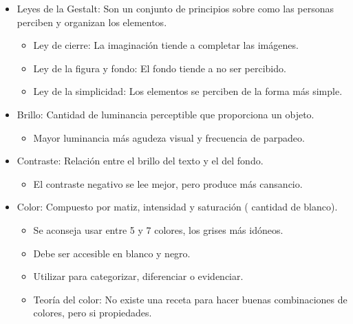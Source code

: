 \documentclass[12pt, twoside, openright]{report} %
\begin{document}
      \begin{itemize}
      
      \item
        Leyes de la Gestalt: Son un conjunto de principios sobre como
        las personas perciben y organizan los elementos.

        \begin{itemize}
        
        \item
          Ley de cierre: La imaginación tiende a completar las imágenes.
        \item
          Ley de la figura y fondo: El fondo tiende a no ser percibido.
        \item
          Ley de la simplicidad: Los elementos se perciben de la forma
          más simple.
        \end{itemize}
      \item
        Brillo: Cantidad de luminancia perceptible que proporciona un
        objeto.

        \begin{itemize}
        
        \item
          Mayor luminancia más agudeza visual y frecuencia de parpadeo.
        \end{itemize}
      \item
        Contraste: Relación entre el brillo del texto y el del fondo.

        \begin{itemize}
        
        \item
          El contraste negativo se lee mejor, pero produce más
          cansancio.
        \end{itemize}
      \item
        Color: Compuesto por matiz, intensidad y saturación ( cantidad
        de blanco).

        \begin{itemize}
        
        \item
          Se aconseja usar entre 5 y 7 colores, los grises más idóneos.
        \item
          Debe ser accesible en blanco y negro.
        \item
          Utilizar para categorizar, diferenciar o evidenciar.
        \item
          Teoría del color: No existe una receta para hacer buenas
          combinaciones de colores, pero si propiedades.


\end{itemize}
\end{itemize}
\end{document}
